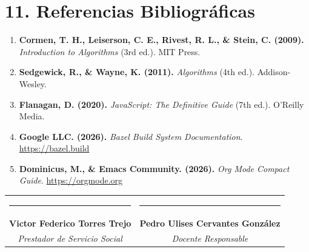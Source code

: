 \documentclass[12 pt]{article}
\begin{document}
\section*{11. Referencias Bibliográficas}

\begin{enumerate}
    \item \textbf{Cormen, T. H., Leiserson, C. E., Rivest, R. L., \& Stein, C. (2009).} \emph{Introduction to Algorithms} (3rd ed.). MIT Press.
    \item \textbf{Sedgewick, R., \& Wayne, K. (2011).} \emph{Algorithms} (4th ed.). Addison-Wesley.
    \item \textbf{Flanagan, D. (2020).} \emph{JavaScript: The Definitive Guide} (7th ed.). O'Reilly Media.
    \item \textbf{Google LLC. (2026).} \emph{Bazel Build System Documentation}. \url{https://bazel.build}
    \item \textbf{Dominicus, M., \& Emacs Community. (2026).} \emph{Org Mode Compact Guide}. \url{https://orgmode.org}
\end{enumerate}

\vspace{1.5cm}

\begin{center}
  \begin{tabular}{cc}
    \rule{6cm}{0.4pt} & \rule{6cm}{0.4pt} \\
    \textbf{Victor Federico Torres Trejo} & \textbf{Pedro Ulises Cervantes González} \\
    \emph{Prestador de Servicio Social} & \emph{Docente Responsable}
  \end{tabular}
\end{center}
\end{document}
